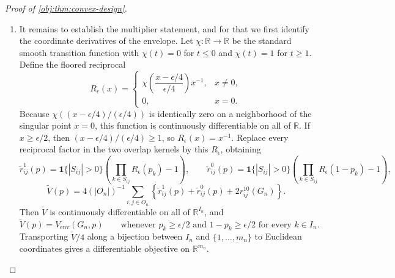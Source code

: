 \documentclass[11pt]{article}
\begin{document}
\begin{proof}[Proof of \cref{obj:thm:convex-design}]
\begin{enumerate}
\item It remains to establish the multiplier statement, and for that we first identify the coordinate derivatives of the envelope.  Let \(\chi:\mathbb R\to\mathbb R\) be the standard smooth transition function with \(\chi(t)=0\) for \(t\le0\) and \(\chi(t)=1\) for \(t\ge1\).  Define the floored reciprocal
\[
R_\epsilon(x)=
\begin{cases}
\chi\!\left(\dfrac{x-\epsilon/4}{\epsilon/4}\right)x^{-1},&x\neq0,\\[0.6em]
0,&x=0.
\end{cases}
\]
Because \(\chi((x-\epsilon/4)/(\epsilon/4))\) is identically zero on a neighborhood of the singular point \(x=0\), this function is continuously differentiable on all of \(\mathbb R\).  If \(x\ge\epsilon/2\), then \((x-\epsilon/4)/(\epsilon/4)\ge1\), so \(R_\epsilon(x)=x^{-1}\).  Replace every reciprocal factor in the two overlap kernels by this \(R_\epsilon\), obtaining
\[
\widetilde r^1_{ij}(p)=\mathbf 1\{|S_{ij}|>0\}\left(\prod_{k\in S_{ij}}R_\epsilon(p_k)-1\right),
\qquad
\widetilde r^0_{ij}(p)=\mathbf 1\{|S_{ij}|>0\}\left(\prod_{k\in S_{ij}}R_\epsilon(1-p_k)-1\right),
\]
\[
\widetilde V(p)=4(|O_n|)^{-1}\sum_{i,j\in O_n}
\left\{\widetilde r^1_{ij}(p)+\widetilde r^0_{ij}(p)+2r^{10}_{ij}(G_n)\right\}.
\]
Then \(\widetilde V\) is continuously differentiable on all of \(\mathbb R^{I_n}\), and
\[
\widetilde V(p)=V_{\mathrm{env}}(G_n,p)
\qquad\text{whenever }p_k\ge\epsilon/2\text{ and }1-p_k\ge\epsilon/2\text{ for every }k\in I_n .
\]
Transporting \(\widetilde V/4\) along a bijection between \(I_n\) and \(\{1,\ldots,m_n\}\) to Euclidean coordinates gives a differentiable objective on \(\mathbb R^{m_n}\).


\end{enumerate}
\end{proof}
\end{document}
